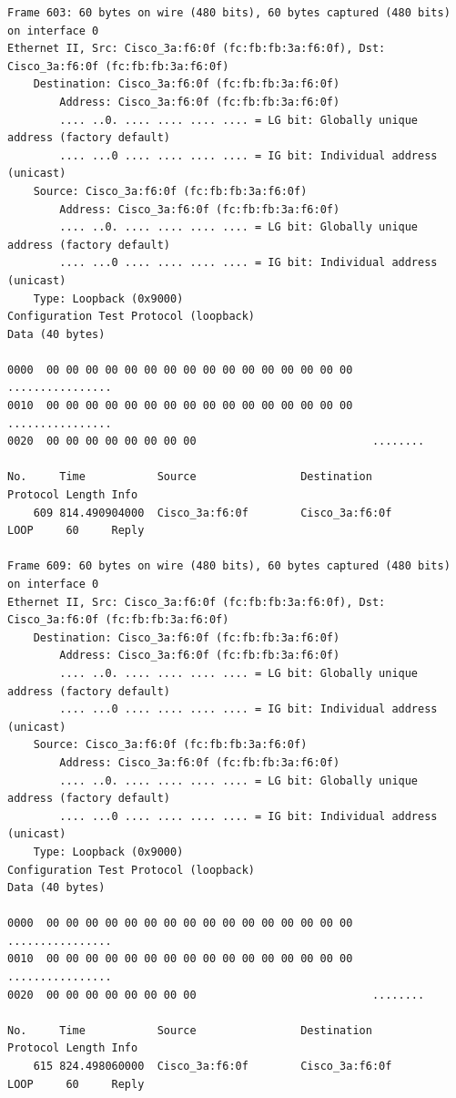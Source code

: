 \documentclass[a4paper,11pt]{article}
\begin{document}
\begin{lstlisting}
Frame 603: 60 bytes on wire (480 bits), 60 bytes captured (480 bits) on interface 0
Ethernet II, Src: Cisco_3a:f6:0f (fc:fb:fb:3a:f6:0f), Dst: Cisco_3a:f6:0f (fc:fb:fb:3a:f6:0f)
    Destination: Cisco_3a:f6:0f (fc:fb:fb:3a:f6:0f)
        Address: Cisco_3a:f6:0f (fc:fb:fb:3a:f6:0f)
        .... ..0. .... .... .... .... = LG bit: Globally unique address (factory default)
        .... ...0 .... .... .... .... = IG bit: Individual address (unicast)
    Source: Cisco_3a:f6:0f (fc:fb:fb:3a:f6:0f)
        Address: Cisco_3a:f6:0f (fc:fb:fb:3a:f6:0f)
        .... ..0. .... .... .... .... = LG bit: Globally unique address (factory default)
        .... ...0 .... .... .... .... = IG bit: Individual address (unicast)
    Type: Loopback (0x9000)
Configuration Test Protocol (loopback)
Data (40 bytes)

0000  00 00 00 00 00 00 00 00 00 00 00 00 00 00 00 00   ................
0010  00 00 00 00 00 00 00 00 00 00 00 00 00 00 00 00   ................
0020  00 00 00 00 00 00 00 00                           ........

No.     Time           Source                Destination           Protocol Length Info
    609 814.490904000  Cisco_3a:f6:0f        Cisco_3a:f6:0f        LOOP     60     Reply

Frame 609: 60 bytes on wire (480 bits), 60 bytes captured (480 bits) on interface 0
Ethernet II, Src: Cisco_3a:f6:0f (fc:fb:fb:3a:f6:0f), Dst: Cisco_3a:f6:0f (fc:fb:fb:3a:f6:0f)
    Destination: Cisco_3a:f6:0f (fc:fb:fb:3a:f6:0f)
        Address: Cisco_3a:f6:0f (fc:fb:fb:3a:f6:0f)
        .... ..0. .... .... .... .... = LG bit: Globally unique address (factory default)
        .... ...0 .... .... .... .... = IG bit: Individual address (unicast)
    Source: Cisco_3a:f6:0f (fc:fb:fb:3a:f6:0f)
        Address: Cisco_3a:f6:0f (fc:fb:fb:3a:f6:0f)
        .... ..0. .... .... .... .... = LG bit: Globally unique address (factory default)
        .... ...0 .... .... .... .... = IG bit: Individual address (unicast)
    Type: Loopback (0x9000)
Configuration Test Protocol (loopback)
Data (40 bytes)

0000  00 00 00 00 00 00 00 00 00 00 00 00 00 00 00 00   ................
0010  00 00 00 00 00 00 00 00 00 00 00 00 00 00 00 00   ................
0020  00 00 00 00 00 00 00 00                           ........

No.     Time           Source                Destination           Protocol Length Info
    615 824.498060000  Cisco_3a:f6:0f        Cisco_3a:f6:0f        LOOP     60     Reply


\end{lstlisting}
\end{document}
